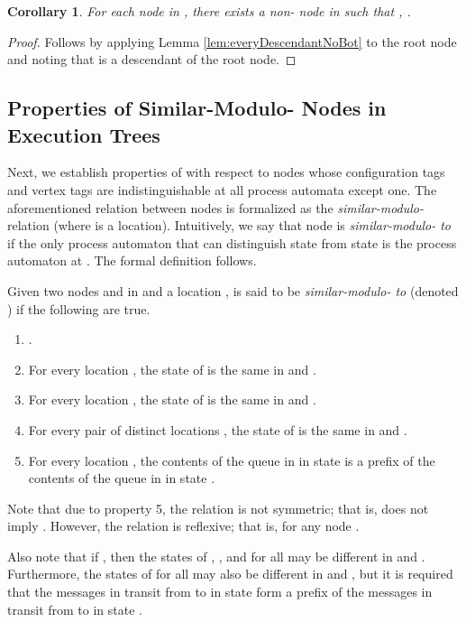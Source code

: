 \documentclass[11pt]{article}
\numberwithin{theorem}{section}
\newtheorem{corollary}[theorem]{Corollary}
\begin{document}
\begin{corollary}\label{cor:NonBotNodesExist}
For each node  in , there exists a non- node  in  such that , .
\end{corollary}
\begin{proof}
 Follows by applying Lemma \ref{lem:everyDescendantNoBot} to the root node and noting that  is a descendant of the root node.
\end{proof}




\subsection{Properties of Similar-Modulo- Nodes in Execution Trees}\label{subsec:PropertiesOfSimilarModuloNodes}
Next, we establish properties of  with respect to nodes
whose configuration tags and vertex tags are indistinguishable at all process automata
except one. The aforementioned relation between nodes is formalized as
the \emph{similar-modulo-} relation (where  is a location).
Intuitively, we say that node  is \emph{similar-modulo- to}  if
the only process automaton that can distinguish state  from state
 is the process automaton at . 
The formal definition follows.

Given two nodes  and  in  and a location ,
 is said to be \emph{similar-modulo- to}  (denoted )
if the following are true. 
\begin{enumerate}
\item .
\item For every location , the state of
        is the same in  and .
\item For every location , the state of  is the same in  and . 
\item For every pair of distinct locations ,
      the state of  is the same in  and . 
\item For every location , the contents of
      the queue in  in state  is a prefix of the contents
      of the queue in  in state .
\end{enumerate}

 Note that due to property 5, the  relation is not symmetric; that is,  does not imply . However, the relation is reflexive; that is,  for any node .

Also note that if , then the states of , , and  for all  may be different in  and . Furthermore, the states of  for all  may also be different in  and , but it is required that the messages in transit from  to  in state  form a prefix of the messages in transit from  to  in state .
\end{document}
